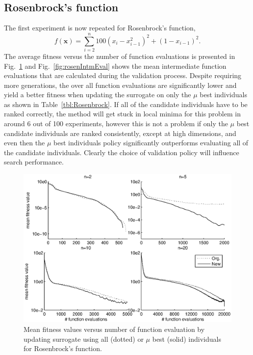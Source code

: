 \documentclass[10pt, conference]{IEEEtran} %
\renewcommand{\vec}[1]{\mathbf{#1}}
\begin{document}
\subsection{Rosenbrock's function}\label{sec:rosen}
The first experiment is now repeated for Rosenbrock's function, 
\begin{equation}f(\vec{x}) = \sum_{i=2}^n 100(x_{i}-x_{i-1}^2)^2 + (1-x_{i-1})^2.\end{equation}
The average fitness versus the number of function evaluations is presented in Fig.~\ref{fig:rosenFitness} and Fig.~\ref{fig:rosenIntmEval} shows the mean intermediate function evaluations that are calculated during the validation process. Despite requiring more generations, the over all function evaluations are significantly lower and yield a better fitness when updating the surrogate on only the $\mu$ best individuals as shown in Table~\ref{tbl:Rosenbrock}. If all of the candidate individuals have to be ranked correctly, the method will get stuck in local minima for this problem in around 6 out of 100 experiments, however this is not a problem if only the $\mu$ best candidate individuals are ranked consistently, except at high dimensions, and even then the $\mu$ best individuals  policy significantly outperforms evaluating all of the candidate individuals. Clearly the choice of validation policy will influence search performance. 
\begin{figure}[b!]
\centering
\includegraphics[trim = 10mm 10mm 10mm 5mm, clip, width=0.8\columnwidth]{rosen_meanFitness_funcEval}
\caption{Mean fitness values versus number of function evaluation by updating surrogate using all (dotted) or $\mu$ best (solid) individuals for Rosenbrock's function.}
\label{fig:rosenFitness}
\end{figure}
\end{document}

